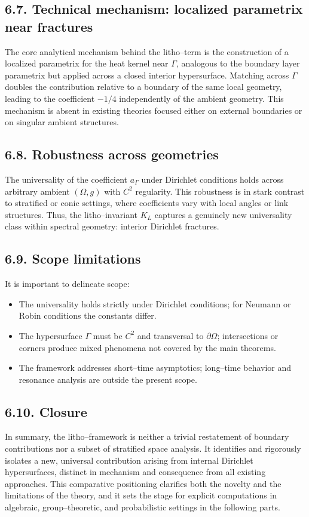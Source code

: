 \subsection*{6.7. Technical mechanism: localized parametrix near fractures}
The core analytical mechanism behind the litho–term is the construction of a localized parametrix for the heat kernel near $\Gamma$, analogous to the boundary layer parametrix but applied across a closed interior hypersurface. Matching across $\Gamma$ doubles the contribution relative to a boundary of the same local geometry, leading to the coefficient $-1/4$ independently of the ambient geometry. This mechanism is absent in existing theories focused either on external boundaries or on singular ambient structures.

\subsection*{6.8. Robustness across geometries}
The universality of the coefficient $a_\Gamma$ under Dirichlet conditions holds across arbitrary ambient $(\Omega,g)$ with $C^2$ regularity. This robustness is in stark contrast to stratified or conic settings, where coefficients vary with local angles or link structures. Thus, the litho–invariant $K_L$ captures a genuinely new universality class within spectral geometry: interior Dirichlet fractures.

\subsection*{6.9. Scope limitations}
It is important to delineate scope:
\begin{itemize}
\item The universality holds strictly under Dirichlet conditions; for Neumann or Robin conditions the constants differ.
\item The hypersurface $\Gamma$ must be $C^2$ and transversal to $\partial\Omega$; intersections or corners produce mixed phenomena not covered by the main theorems.
\item The framework addresses short–time asymptotics; long–time behavior and resonance analysis are outside the present scope.
\end{itemize}

\subsection*{6.10. Closure}
In summary, the litho–framework is neither a trivial restatement of boundary contributions nor a subset of stratified space analysis. It identifies and rigorously isolates a new, universal contribution arising from internal Dirichlet hypersurfaces, distinct in mechanism and consequence from all existing approaches. This comparative positioning clarifies both the novelty and the limitations of the theory, and it sets the stage for explicit computations in algebraic, group–theoretic, and probabilistic settings in the following parts.

